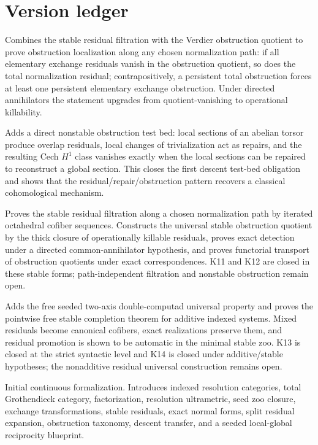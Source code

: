 \documentclass[11pt]{article}
\theoremstyle{definition}
\theoremstyle{remark}
\begin{document}
\section{Version ledger}

\begin{description}[leftmargin=8em,style=nextline]
\item[v0.5.0] Combines the stable residual filtration with the Verdier obstruction quotient to prove obstruction localization along any chosen normalization path: if all elementary exchange residuals vanish in the obstruction quotient, so does the total normalization residual; contrapositively, a persistent total obstruction forces at least one persistent elementary exchange obstruction. Under directed annihilators the statement upgrades from quotient-vanishing to operational killability.
\item[v0.4.0] Adds a direct nonstable obstruction test bed: local sections of an abelian torsor produce overlap residuals, local changes of trivialization act as repairs, and the resulting Cech $H^1$ class vanishes exactly when the local sections can be repaired to reconstruct a global section. This closes the first descent test-bed obligation and shows that the residual/repair/obstruction pattern recovers a classical cohomological mechanism.
\item[v0.3.0] Proves the stable residual filtration along a chosen normalization path by iterated octahedral cofiber sequences. Constructs the universal stable obstruction quotient by the thick closure of operationally killable residuals, proves exact detection under a directed common-annihilator hypothesis, and proves functorial transport of obstruction quotients under exact correspondences. K11 and K12 are closed in these stable forms; path-independent filtration and nonstable obstruction remain open.
\item[v0.2.0] Adds the free seeded two-axis double-computad universal property and proves the pointwise free stable completion theorem for additive indexed systems. Mixed residuals become canonical cofibers, exact realizations preserve them, and residual promotion is shown to be automatic in the minimal stable zoo. K13 is closed at the strict syntactic level and K14 is closed under additive/stable hypotheses; the nonadditive residual universal construction remains open.
\item[v0.1.0] Initial continuous formalization. Introduces indexed resolution categories, total Grothendieck category, factorization, resolution ultrametric, seed zoo closure, exchange transformations, stable residuals, exact normal forms, split residual expansion, obstruction taxonomy, descent transfer, and a seeded local-global reciprocity blueprint.
\end{description}
\end{document}
